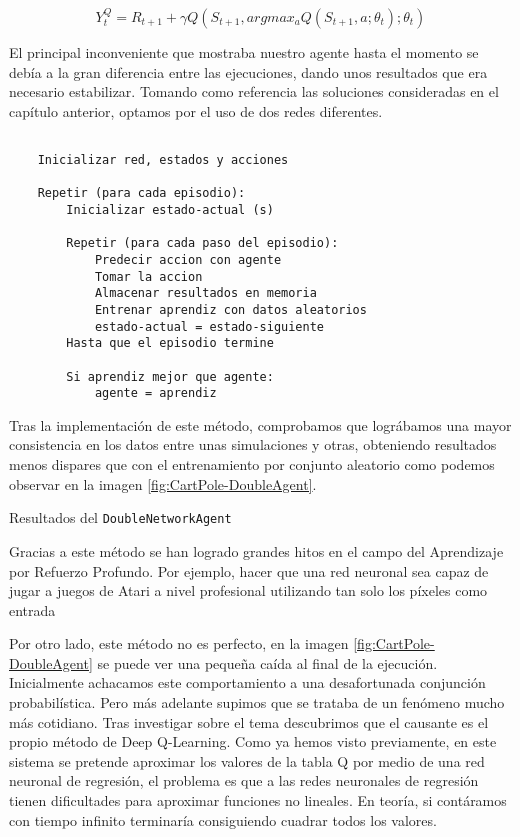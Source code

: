 $$Y^Q_{t} = R_{t+1} + \gamma Q(S_{t+1}, argmax_{a} Q(S_{t+1}, a; \theta_{t}); \theta_{t})$$

El principal inconveniente que mostraba nuestro agente hasta el momento se debía a la gran diferencia entre las ejecuciones, dando unos resultados que era necesario estabilizar. Tomando como referencia las soluciones consideradas en el capítulo anterior, optamos por el uso de dos redes diferentes.

\begin{minipage}{0.9\linewidth}%
    \begin{lstlisting}[frame=tb, caption=Pseudocódigo DoubleAgent, inputencoding=latin1, label=code:cartpole_drl4]
    
    Inicializar red, estados y acciones
    
    Repetir (para cada episodio):
        Inicializar estado-actual (s)
        
        Repetir (para cada paso del episodio):
            Predecir accion con agente
            Tomar la accion
            Almacenar resultados en memoria
            Entrenar aprendiz con datos aleatorios
            estado-actual = estado-siguiente
        Hasta que el episodio termine

        Si aprendiz mejor que agente:
            agente = aprendiz
    \end{lstlisting}%
\end{minipage}

Tras la implementación de este método, comprobamos que lográbamos una mayor consistencia en los datos entre unas simulaciones y otras, obteniendo resultados menos dispares que con el entrenamiento por conjunto aleatorio como podemos observar en la imagen \ref{fig:CartPole-DoubleAgent}.

%
       {Resultados del \texttt{DoubleNetworkAgent}}

Gracias a este método se han logrado grandes hitos en el campo del Aprendizaje por Refuerzo Profundo. Por ejemplo, hacer que una red neuronal sea capaz de jugar a juegos de Atari a nivel profesional utilizando tan solo los píxeles como entrada \citep{mnih2013playing}

Por otro lado, este método no es perfecto, en la imagen \ref{fig:CartPole-DoubleAgent} se puede ver una pequeña caída al final de la ejecución. Inicialmente achacamos este comportamiento a una desafortunada conjunción probabilística. Pero más adelante supimos que se trataba de un fenómeno mucho más cotidiano. Tras investigar sobre el tema descubrimos que el causante es el propio método de Deep Q-Learning. Como ya hemos visto previamente, en este sistema se pretende aproximar los valores de la tabla Q por medio de una red neuronal de regresión, el problema es que a las redes neuronales de regresión tienen dificultades para aproximar funciones no lineales. En teoría, si contáramos con tiempo infinito terminaría consiguiendo cuadrar todos los valores.

